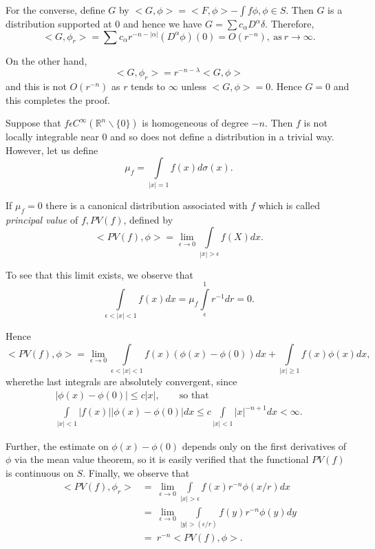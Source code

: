 For the converse, define $G$ by $< G, \phi > = <  F, \phi > - \int f
\phi, \phi \in S$.  
Then $G$ is a distribution supported at $0$ and hence we have $G =
\sum c_ \alpha  D^\alpha  \delta$. Therefore, 
$$
< G, \phi _r > = \sum c_ \alpha r^{-n- | \alpha|} (D^\alpha \phi)
(0) = O (r^{-n}), ~\text{as}~ r \to \infty.
$$
 
On the other hand, 
  $$
 < G, \phi_r > = r ^{-n-\lambda}<G, \phi>
 $$
 and this is not $O(r^{-n})$ as $r$ tends to $\infty$ unless $< G,
 \phi > = 0$. Hence $G= 0$ and this completes the proof. 
 
 Suppose that $f \epsilon C^ \infty ( \mathbb{R}^n \backslash
 \{0\})$ is homogeneous of degree $-n$. Then $f$ is not locally
 integrable near $0$ and so does not define a distribution in a
 trivial way. However,  let us define  
 $$
 \mu _f = \int\limits_{| x| =1} f(x) d \sigma (x).		
 $$

  If $\mu _f = 0$ there is a canonical distribution associated with
  $f$ which is called \textit{principal value } of $f, PV(f)$, defined
  by  
  $$
  < PV (f), \phi > = \lim_{ \epsilon \to 0  } \int\limits_{| x| >
    \epsilon} f(X) dx. 
  $$
  
  To see that this limit exists, we observe that 
  $$
  \int\limits_{\epsilon < | x| < 1} f(x) dx = \mu _f
  \int\limits_{\epsilon}^{1} r^{-1} dr = 0. 
  $$
  
  Hence
  $$
  < PV (f), \phi > = \lim_{\epsilon \rightarrow 0}
  \int\limits_{\epsilon < | x | < 1} f(x) (\phi (x) - \phi (0)) dx
  + \int\limits_{| x| \ge 1} f(x) \phi (x) dx, 
  $$
 where\pageoriginale the last integrals are absolutely convergent, since
\begin{gather*}
  | \phi (x) - \phi (0) | \le c |x|, \qquad \text{so that}\\
  \int\limits_{|x| < 1} | f ( x) || \phi (x) - \phi (0)| dx \le c
  \int\limits_{|x| < 1} | x |^{-n+1} dx < \infty. 
\end{gather*}

Further, the estimate on $\phi (x) - \phi (0)$ depends only on the
first derivatives of $\phi$ via the mean value theorem, so it is
easily verified that the functional $PV(f)$ is continuous on
$S$. Finally, we observe that  
\begin{align*}
  < PV (f), \phi_r > &= ~ \lim_{\epsilon \to 0} \int\limits_{|x| >
    \epsilon} f(x) r^{-n} \phi (x/r) dx\\ 
  & = ~ \lim_{\epsilon \to 0} \int\limits_{|y| > (\epsilon/r)}
  f(y) r^{-n} \phi (y) dy\\ 
  & = ~ r^{-n} < PV (f), \phi >.
\end{align*}

